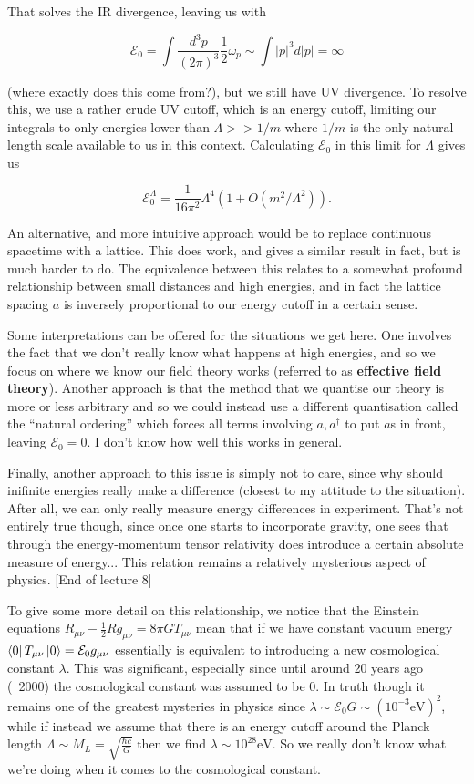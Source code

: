 \documentclass{article}
\theoremstyle{definition}
\begin{document}
That solves the IR divergence, leaving us with

$$ \mathcal{E}_0 = \int \frac{d^3p}{(2\pi)^3} \frac{1}{2} \omega_p \sim \int
|p|^3 d|p| = \infty $$

(where exactly does this come from?), but we still have UV divergence. To
resolve this, we use a rather crude UV cutoff, which is an energy cutoff,
limiting our integrals to only energies lower than $\Lambda >> 1/m$ where $1/m$
is the only natural length scale available to us in this context. Calculating
$\mathcal{E}_0$ in this limit for $\Lambda$ gives us

$$ \mathcal{E}_0^\Lambda = \frac{1}{16 \pi^2} \Lambda^4 (1 + O(m^2 /
\Lambda^2)). $$

An alternative, and more intuitive approach would be to replace continuous
spacetime with a lattice. This does work, and gives a similar result in fact,
but is much harder to do. The equivalence between this relates to a somewhat
profound relationship between small distances and high energies, and in fact the
lattice spacing $a$ is inversely proportional to our energy cutoff in a certain
sense. 

Some interpretations can be offered for the situations we get here. One involves
the fact that we don't really know what happens at high energies, and so we
focus on where we know our field theory works (referred to as \textbf{effective
  field theory}). Another approach is that the method that we quantise our
theory is more or less arbitrary and so we could instead use a different
quantisation called the ``natural ordering'' which forces all terms involving
$a, a^\dagger$ to put $a$s in front, leaving $\mathcal{E}_0 = 0$. I don't know
how well this works in general.

Finally, another approach to this issue is simply not to care, since why should
inifinite energies really make a difference (closest to my attitude to the
situation). After all, we can only really measure energy differences in
experiment. That's not entirely true though, since once one starts to
incorporate gravity, one sees that through the energy-momentum tensor relativity
does introduce a certain absolute measure of energy... This relation remains a
relatively mysterious aspect of physics. [End of lecture 8]

To give some more detail on this relationship, we notice that the Einstein
equations $R_{\mu\nu} - \frac{1}{2} R g_{\mu \nu} = 8\pi G T_{\mu \nu}$ mean
that if we have constant vacuum energy $\bra{0} T_{\mu \nu} \ket{0} =
\mathcal{E}_0 g_{\mu \nu}$ essentially is equivalent to introducing a new
cosmological constant $\lambda$. This was significant,
especially since until around 20 years ago (~2000) the cosmological constant was
assumed to be 0. In truth though it  remains one of the greatest mysteries in
physics since $\lambda \sim \mathcal{E}_0 G \sim (10^{-3} \text{eV})^2$, while
if instead we assume that there is an energy cutoff around the Planck length
$\Lambda \sim M_L = \sqrt{\frac{\hbar c}{G}}$ then we find $\lambda \sim 10^{28}
\text{eV}$. So we really don't know what we're doing when it comes to the
cosmological constant.
\end{document}
